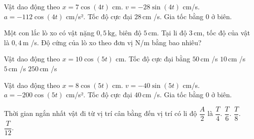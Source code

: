 \begin{ex}
Vật dao động theo $x=7\cos(4t)$ cm.
\choiceTF
{\True $v=-28\sin(4t)$ cm/s.}
{\True $a=-112\cos(4t)$ cm/s².}
{\True Tốc độ cực đại $28\,\text{cm}$ /s.}
{Gia tốc bằng 0 ở biên.}
\end{ex}

\begin{ex}
Một con lắc lò xo có vật nặng $0,5\,\text{kg}$, biên độ $5\,\text{cm}$. Tại li độ $3\,\text{cm}$, tốc độ của vật là $0,4\,\text{m}$ /s. Độ cứng của lò xo theo đơn vị N/m bằng bao nhiêu?
\end{ex}

\begin{ex}
Vật dao động theo $x=10\cos(5t)$ cm. Tốc độ cực đại bằng
\choice
{\True $50\,\text{cm}$ /s}
{$10\,\text{cm}$ /s}
{$5\,\text{cm}$ /s}
{$250\,\text{cm}$ /s}
\end{ex}

\begin{ex}
Vật dao động theo $x=8\cos(5t)$ cm.
\choiceTF
{\True $v=-40\sin(5t)$ cm/s.}
{\True $a=-200\cos(5t)$ cm/s².}
{\True Tốc độ cực đại $40\,\text{cm}$ /s.}
{Gia tốc bằng 0 ở biên.}
\end{ex}

\begin{ex}
Thời gian ngắn nhất vật đi từ vị trí cân bằng đến vị trí có li độ $\dfrac{A}{2}$ là
\choice
{$\dfrac{T}{4}.$}
{$\dfrac{T}{6}.$}
{$\dfrac{T}{8}.$}
{\True $\dfrac{T}{12}.$}
\end{ex}

